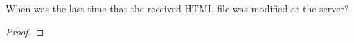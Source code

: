 \documentclass[../../main.tex]{subfiles}
\begin{document}
\begin{wts}
When was the last time that the received HTML file was modified at the server?
\end{wts}
\begin{proof}

\end{proof}
\end{document}
